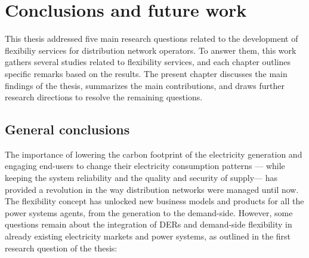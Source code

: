 \chapter{Conclusions and future work}
\label{conclus}
   This thesis addressed five main research questions related to the development of flexibiliy services for distribution network operators. To answer them, this work gathers several studies related to flexibility services, and each chapter outlines specific remarks based on the results. The present chapter discusses the main findings of the thesis, summarizes the main contributions, and draws further research directions to resolve the remaining questions. 

\section{General conclusions}
The importance of lowering the carbon footprint of the electricity generation and engaging end-users to change their electricity consumption patterns --- while keeping the system reliability and the quality and security of supply--- has provided a revolution in the way distribution networks were managed until now. The flexibility concept has unlocked new business models and products for all the power systems agents, from the generation to the demand-side. However, some questions remain about the integration of DERs and demand-side flexibility in already existing electricity markets and power systems, as outlined in the first research question of the thesis: 


